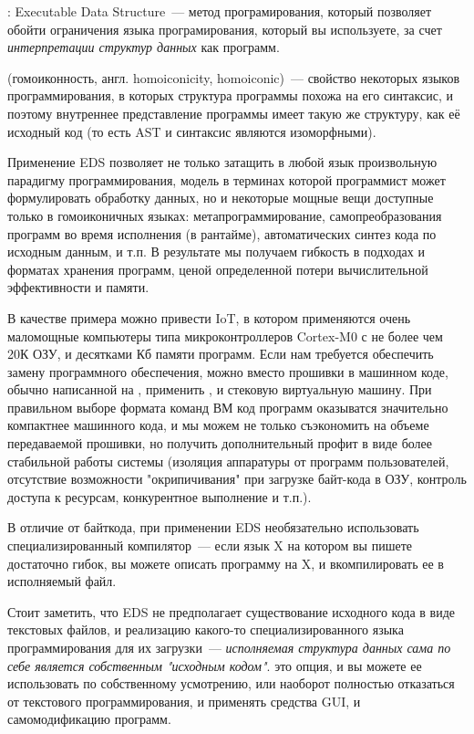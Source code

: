 \clearpage
{}\label{eds}

: Executable Data Structure\ --- метод програмирования, который позволяет обойти
ограничения языка програмирования, который вы используете, за счет \emph{интерпретации структур данных}
как программ.

 (гомоиконность, англ. homoiconicity, homoiconic)\ --- 
свойство некоторых языков программирования, в которых структура программы похожа 
на его синтаксис, и поэтому внутреннее представление программы имеет такую же структуру, как её 
исходный код (то есть AST и синтаксис являются изоморфными).

Применение EDS позволяет не только затащить в любой язык произвольную парадигму программирования,
модель в терминах которой программист может формулировать обработку данных, но и некоторые мощные
вещи доступные только в гомоиконичных языках: метапрограммирование, самопреобразования программ
во время исполнения (в рантайме), автоматических синтез кода по исходным данным, и т.п.
В результате мы получаем гибкость в подходах и форматах хранения программ, ценой определенной потери
вычислительной эффективности и памяти.

В качестве примера можно привести IoT, в котором применяются очень маломощные
компьютеры типа микроконтроллеров Cortex-M0 с не более чем 20К ОЗУ, и десятками Кб памяти программ.
Если нам требуется обеспечить замену программного обеспечения, можно вместо прошивки в машинном коде,
обычно написанной на \ci, применить , и стековую виртуальную машину.
При правильном выборе формата команд ВМ код программ оказыватся значительно компактнее машинного кода,
и мы можем не только съэкономить на объеме передаваемой прошивки, но получить дополнительный
профит в виде более стабильной работы системы (изоляция аппаратуры от программ пользователей, отсутствие
возможности "окрипичивания" при загрузке байт-кода в ОЗУ, контроль доступа к ресурсам,
конкурентное выполнение и т.п.).

В отличие от байткода, при применении EDS необязательно использовать специализированный
компилятор\ --- если язык X на котором вы пишете  достаточно гибок, вы можете
описать программу на X, и вкомпилировать ее в исполняемый файл.

Стоит заметить, что EDS не предполагает существование исходного кода в виде текстовых файлов,
и реализацию какого-то специализированного языка программирования для их загрузки\ --- \textit{исполняемая
структура данных сама по себе является собственным "исходным кодом"}.  это опция, и вы можете
ее использовать по собственному усмотрению, или наоборот полностью отказаться от текстового программирования,
и применять средства GUI, и самомодификацию программ.

